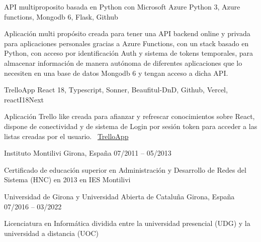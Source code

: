 \documentclass[]{awesome-cv}
\begin{document}
\begin{cventries}
    \cventry
	{}
	{API multiproposito basada en Python con Microsoft Azure \vspace{-5mm}}
	{Python 3, Azure functions, Mongodb 6, Flask, Github \vspace{-5mm}}
	{}
	{\begin{cvsectionnormaltext}
		\item{Aplicación multi propósito creada para tener una API backend online y privada para aplicaciones personales gracias a Azure Functions, con un stack basado en Python, con acceso por identificación Auth y sistema de tokens temporales, para almacenar información de manera autónoma de diferentes aplicaciones que lo necesiten en una base de datos Mongodb 6 y tengan acceso a dicha API.
		\newline}
	\end{cvsectionnormaltext}}

    \cventry
	{}
	{TrelloApp \vspace{-5mm}}
	{React 18, Typescript, Sonner, Beaufitul-DnD, Github, Vercel, reactI18Next \vspace{-5mm}}
	{}
	{\begin{cvsectionnormaltext}
		\item{Aplicación Trello like creada para afianzar y refrescar conocimientos sobre React, dispone de conectividad y de sistema de Login por sesión token para acceder a las listas creadas por el usuario.
		\newline \faLink\ \href{https://trello-app-giacconidev.vercel.app/user/login}{TrelloApp}}
	\end{cvsectionnormaltext}}
 
	\vspace{-5mm}
\end{cventries}

\vspace{8mm}
\begin{cventries}
	\vspace{2mm}
	\cventry
	{}
	{Instituto Montilivi \vspace{-5mm}}
	{Girona, España \vspace{-5mm}}
	{07/2011 – 05/2013 \vspace{-5mm}}
	{\begin{cvsectionnormaltext} 
		\item{Certificado de educación superior en Administración y Desarrollo de Redes del Sistema (HNC) en 2013 en IES Montilivi}
	\end{cvsectionnormaltext}}

 \cventry
	{}
	{Universidad de Girona y Universidad Abierta de Cataluña \vspace{-5mm}}
	{Girona, España \vspace{-5mm}}
	{07/2016 – 03/2022 \vspace{-5mm}}
	{\begin{cvsectionnormaltext} 
		\item{Licenciatura en Informática dividida entre la universidad presencial (UDG) y la universidad a distancia (UOC)}
	\end{cvsectionnormaltext}}
\end{cventries}
\end{document}

